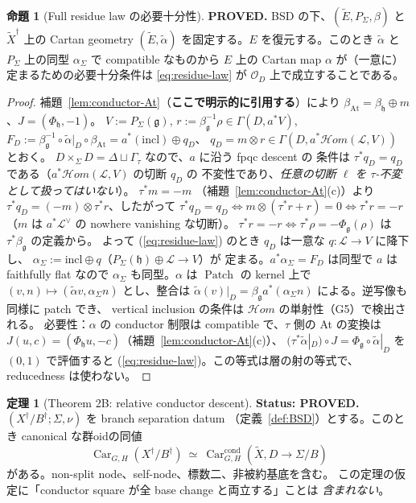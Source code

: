 \documentclass[11pt,a4paper]{article}
\numberwithin{equation}{section}
\theoremstyle{definition}
\newtheorem{proposition}[definition]{命題}
\newtheorem{theorem}[definition]{定理}
\DeclareMathOperator{\At}{At}
\newcommand{\OO}{\mathcal O}
\newcommand{\g}{\mathfrak g}
\newcommand{\h}{\mathfrak h}
\newcommand{\tX}{\widetilde X}
\newcommand{\tE}{\widetilde E}
\newcommand{\tal}{\widetilde\alpha}
\newcommand{\LL}{\mathcal L}
\newcommand{\Car}{\operatorname{Car}}
\begin{document}
\begin{proposition}[Full residue law の必要十分性]\label{prop:residue}
\textbf{PROVED.} BSD の下、$(\tE,P_\Sigma,\beta)$ と $\tX^\dagger$ 上の Cartan
geometry $(\tE,\tal)$ を固定する。$E$ を復元する。このとき $\tal$ と
$P_\Sigma$ 上の同型 $\alpha_\Sigma$ で compatible なものから $E$ 上の
Cartan map $\alpha$ が（一意に）定まるための必要十分条件は
\eqref{eq:residue-law} が $\OO_D$ 上で成立することである。
\end{proposition}

\begin{proof}
補題~\ref{lem:conductor-At}（\textbf{ここで明示的に引用する}）により
$\beta_{\At}=\beta_\h\oplus m$、$J=(\Phi_\h,-1)$。
$V:=P_\Sigma(\g)$, $r:=\beta_\g^{-1}\rho\in\Gamma(D,a^*V)$,
$F_D:=\beta_\g^{-1}\circ\tal|_D\circ\beta_{\At}=a^*(\mathrm{incl})\oplus q_D$、
$q_D=m\otimes r\in\Gamma(D,a^*\mathcal Hom(\LL,V))$ とおく。
$D\times_\Sigma D=\Delta\sqcup\Gamma_\tau$ なので、$a$ に沿う fpqc descent の
条件は $\tau^*q_D=q_D$ である（$a^*\mathcal Hom(\LL,V)$ の切断 $q_D$ の
不変性であり、\emph{任意の切断 $\ell$ を $\tau$-不変として扱ってはいない}）。
$\tau^*m=-m$ （補題~\ref{lem:conductor-At}(c)）より
$\tau^*q_D=(-m)\otimes\tau^*r$、したがって
$\tau^*q_D=q_D\iff m\otimes(\tau^*r+r)=0\iff\tau^*r=-r$
（$m$ は $a^*\LL^\vee$ の nowhere vanishing な切断）。
$\tau^*r=-r\iff\tau^*\rho=-\Phi_\g(\rho)$ は $\tau^*\beta_\g$ の定義から。
よって (\ref{eq:residue-law}) のとき $q_D$ は一意な $q:\LL\to V$ に降下し、
$\alpha_\Sigma:=\mathrm{incl}\oplus q$（$P_\Sigma(\h)\oplus\LL\to V$）が
定まる。$a^*\alpha_\Sigma=F_D$ は同型で $a$ は faithfully flat なので
$\alpha_\Sigma$ も同型。$\alpha$ は $\operatorname{Patch}$ の kernel 上で
$(v,n)\mapsto(\tal v,\alpha_\Sigma n)$ とし、整合は
$\tal(v)|_D=\beta_\g a^*(\alpha_\Sigma n)$ による。逆写像も同様に patch でき、
vertical inclusion の条件は $\mathcal Hom$ の単射性（G5）で検出される。
必要性：$\alpha$ の conductor 制限は compatible で、$\tau$ 側の At の変換は
$J(u,c)=(\Phi_\h u,-c)$（補題~\ref{lem:conductor-At}(c)）、
$(\tau^*\tal|_D)\circ J=\Phi_\g\circ\tal|_D$ を $(0,1)$ で評価すると
(\ref{eq:residue-law})。この等式は層の射の等式で、reducedness は使わない。
\end{proof}

\begin{theorem}[Theorem 2B: relative conductor descent]\label{thm:2B}
\textbf{Status: PROVED.}
$(X^\dagger/B^\dagger;\Sigma,\nu)$ を branch separation datum
（定義~\ref{def:BSD}）とする。このとき canonical な群oidの同値
\[
  \boxed{\ \Car_{G,H}(X^\dagger/B^\dagger)\ \simeq\
  \Car^{\mathrm{cond}}_{G,H}(\tX,D\to\Sigma/B)\ }
\]
がある。non-split node、self-node、標数二、非被約基底を含む。
この定理の仮定に「conductor square が全 base change と両立する」ことは
\emph{含まれない}。
\end{theorem}
\end{document}
